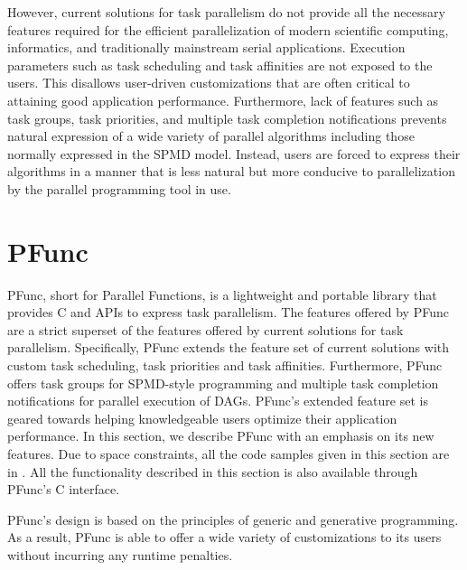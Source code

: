 \documentclass[9pt,twocolumn,letter]{article}
\begin{document}
However, current solutions for task
parallelism do not provide all the necessary features required for the
efficient parallelization of modern scientific computing, informatics, and
traditionally mainstream serial applications.  Execution parameters such as
task scheduling and task affinities are not exposed to the users. This
disallows user-driven customizations that are often critical to attaining good
application performance. Furthermore, lack of features such as task groups,
task priorities, and multiple task completion notifications prevents natural
expression of a wide variety of parallel algorithms including those normally
expressed in the SPMD model. Instead, users are forced to express their
algorithms in a manner that is less natural but more conducive to
parallelization by the parallel programming tool in use.


\section{PFunc}
\label{sec:pfunc}

PFunc, short for Parallel Functions, is a lightweight and portable library that
provides C and \Cpp{} APIs to express task parallelism. The features offered by
PFunc are a strict superset of the features offered by current solutions for
task parallelism.  Specifically, PFunc extends the feature set of current
solutions with custom task scheduling, task priorities and task affinities.
Furthermore, PFunc offers task groups for SPMD-style programming and multiple
task completion notifications for parallel execution of DAGs.  PFunc's extended
feature set is geared towards helping knowledgeable users optimize their
application performance. In this section, we describe PFunc with an emphasis on
its new features.  Due to space constraints, all the code samples given in this
section are in \Cpp{}. All the functionality described in this section is also
available through PFunc's C interface.

PFunc's design is based on the principles of generic and generative
programming. As a result, PFunc is able to offer a wide variety of
customizations to its users without incurring any runtime penalties.  

\small


\end{document}

